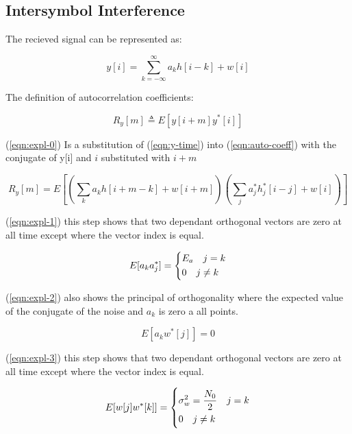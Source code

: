 \subsection{Intersymbol Interference}

The recieved signal can be represented as:

\begin{equation}
    \label{eqn:y-time}
    y[i] = \sum_{k=-\infty}^\infty a_k h[i-k] + w[i]
\end{equation}

The definition of autocorrelation coefficients:

\begin{equation}
    \label{eqn:auto-coeff}
    R_y[m] \triangleq E[y[i+m]y^*[i]]
\end{equation}

(\ref{eqn:expl-0}) Is a substitution of (\ref{eqn:y-time}) into (\ref{eqn:auto-coeff}) with the conjugate of y[i] and
$i$ substituted with $i+m$

\begin{equation}
    \label{eqn:expl-0}
    R_y[m] = E[(\sum_{k}a_kh[i+m-k]+w[i+m])(\sum_j a_j^* h_j^*[i-j]+w[i])]
\end{equation}

(\ref{eqn:expl-1}) this step shows that two dependant orthogonal vectors are zero at all time except where the vector index is equal.

\begin{equation}
    \label{eqn:expl-1}
    E[a_k a_j^*] =
    \begin{dcases}
        E_a \quad j=k \\
        0 \quad j \neq k
    \end{dcases}
\end{equation}

(\ref{eqn:expl-2}) also shows the principal of orthogonality where the expected value of the conjugate of the noise and $a_k$ is
zero a all points.

\begin{equation}
    \label{eqn:expl-2}
    E[a_k w^*[j]] = 0
\end{equation}

(\ref{eqn:expl-3}) this step shows that two dependant orthogonal vectors are zero at all time except where the vector index is equal.

\begin{equation}
    \label{eqn:expl-3}
    E[w[j]w^*[k]] =
    \begin{dcases}
        \sigma_w^2 = \frac{N_0}{2} \quad j=k \\
        0 \quad j \neq k
    \end{dcases}
\end{equation}

